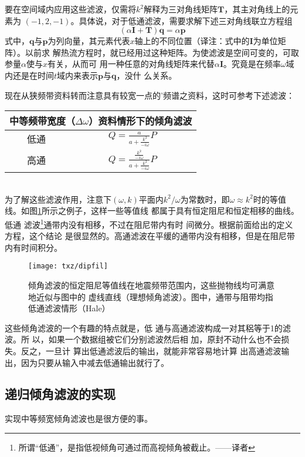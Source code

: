 要在空间域内应用这些滤波，仅需将$k^2$解释为三对角线矩阵$\mathbf{T}$，其主对角线上的元素为
$(-1,2,-1)$。具体说，对于低通滤波，需要求解下述三对角线联立方程组
\begin{equation}
(\alpha\mathbf{I}+\mathbf{T})\mathbf{q}=\alpha\mathbf{p}
\label{eq:ex2.5.1}
\end{equation}
式中，$\mathbf{q}$与$\mathbf{p}$为列向量，其元素代表$x$轴上的不同位置（译注：式中的$\mathbf{I}$为单位矩阵）。以前求
解热流方程时，就已经用过这种矩阵。为使滤波是空间可变的，可取参量$\alpha$使与$x$有关，从而可
用一种任意的对角线矩阵来代替$\alpha\mathbf{I}$。究竟是在频率$\omega$域内还是在时间$t$域内来表示$\mathbf{p}$与$\mathbf{q}$，没什
么关系。

现在从狭频带资料转而注意具有较宽一点的'频谱之资料，这时可参考下述滤波：

\begin{tabular}{|c|c|}
\hline
\multicolumn{2}{|c|}{中等频带宽度（$\Delta\omega$）资料情形下的倾角滤波} \\ \hline
低通&$Q=\frac{a}{a+\frac{k^2}{-i\omega}}P$\\ \hline
高通&$Q=\frac{\frac{k^2}{-i\omega}}{a+\frac{k^2}{-i\omega}}P$ \\ \hline
\end{tabular}\\
为了解这些滤波作用，注意下$(\omega,k)$平面内$k^2/\omega$为常数时，即$\omega\approx k^2$时的等值
线。如图\ref{fig:txz/dipfil}所示之例子，这样一些等值线
都属于具有恒定阻尼和恒定相移的曲线。低通
滤波\footnote{所谓“低通”，是指低视倾角可通过而高视倾角被截止。——译者}通带内没有相移，不过在阻尼带内有时
间微分。根据前面给出的定义方程，这个结论
是很显然的。高通滤波在平缓的通带内没有相移，但是在阻尼带内有时间积分。
\begin{figure}[H]
\centering
\texttt{[image: txz/dipfil]}
\caption[dipfil]{倾角滤波的恒定阻尼等值线在地震频带范围内，这些抛物线均可满意地近似与图中的
虚线直线（理想倾角滤波）。图中，通带与阻带均指低通滤波情形（Hale）}
\label{fig:txz/dipfil}
\end{figure}
这些倾角滤波的一个有趣的特点就是，低
通与高通滤波构成一对其稆等于1的滤波。所
以，如果一个数据组被它们分别滤波然后相
加，原封不动什么也不会损失。反之，一旦计
算出低通滤波后的输出，就能非常容易地计算
出高通滤波输出，因为只要从输入中减去低通输出就行了。

\subsection{递归倾角滤波的实现}
\label{sec:2.5.2}
实现中等频宽倾角滤波也是很方便的事。

